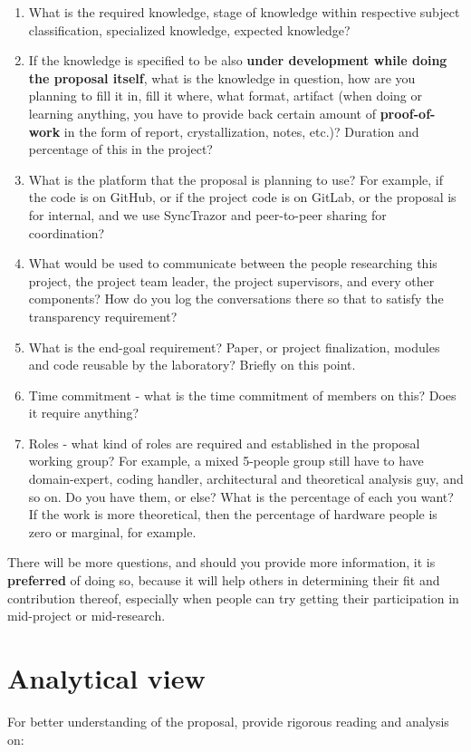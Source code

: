\documentclass[10pt,a4paper]{article}
\begin{document}
\begin{enumerate}
    \item What is the required knowledge, stage of knowledge within respective subject classification, specialized knowledge, expected knowledge? 
    \item If the knowledge is specified to be also \textbf{under development while doing the proposal itself}, what is the knowledge in question, how are you planning to fill it in, fill it where, what format, artifact (when doing or learning anything, you have to provide back certain amount of \textbf{proof-of-work} in the form of report, crystallization, notes, etc.)? Duration and percentage of this in the project? 
    \item What is the platform that the proposal is planning to use? For example, if the code is on GitHub, or if the project code is on GitLab, or the proposal is for internal, and we use \textsf{SyncTrazor} and peer-to-peer sharing for coordination? 
    \item What would be used to communicate between the people researching this project, the project team leader, the project supervisors, and every other components? How do you log the conversations there so that to satisfy the transparency requirement?
    \item What is the end-goal requirement? Paper, or project finalization, modules and code reusable by the laboratory? Briefly on this point. 
    \item Time commitment - what is the time commitment of members on this? Does it require anything? 
    \item Roles - what kind of roles are required and established in the proposal working group? For example, a mixed 5-people group still have to have domain-expert, coding handler, architectural and theoretical analysis guy, and so on. Do you have them, or else? What is the percentage of each you want? If the work is more theoretical, then the percentage of hardware people is zero or marginal, for example.  
\end{enumerate}

There will be more questions, and should you provide more information, it is \textbf{preferred} of doing so, because it will help others in determining their fit and contribution thereof, especially when people can try getting their participation in mid-project or mid-research. 

\section*{Analytical view}
\label{sec:analytic}
For better understanding of the proposal, provide rigorous reading and analysis on: 
\end{document}
